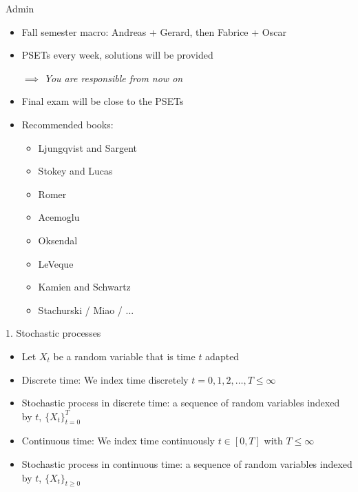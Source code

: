 \documentclass[10pt]{beamer}
\begin{document}
\begin{frame}{Admin}
\begin{itemize}
\item Fall semester macro: Andreas + Gerard, then Fabrice + Oscar

\item PSETs every week, solutions will be provided

$\implies$ \textit{You are responsible from now on}

\item Final exam will be close to the PSETs

\item Recommended books:
\begin{itemize}
	\item Ljungqvist and Sargent
	\vspace{-3mm}
	\item Stokey and Lucas
	\vspace{-3mm}
	\item Romer
	\vspace{-3mm}
	\item Acemoglu
	\vspace{-3mm}
	\item Oksendal
	\vspace{-3mm}
	\item LeVeque
	\vspace{-3mm}
	\item Kamien and Schwartz
	\vspace{-3mm}
	\item Stachurski / Miao / ...
\end{itemize}
\end{itemize}
\end{frame}



\begin{frame}{1. Stochastic processes}
\begin{itemize}
\item Let $X_t$ be a random variable that is time $t$ adapted

\item Discrete time: We index time discretely $t = 0, 1, 2, \ldots, T \leq \infty$

\item Stochastic process in discrete time: a sequence of random variables indexed by $t$, $\{X_t\}_{t=0}^T$

\item Continuous time: We index time continuously $t \in [0, T]$ with $T \leq \infty$

\item Stochastic process in continuous time: a sequence of random variables indexed by $t$, $\{X_t\}_{t \geq 0}$

\end{itemize}
\end{frame}
\end{document}
